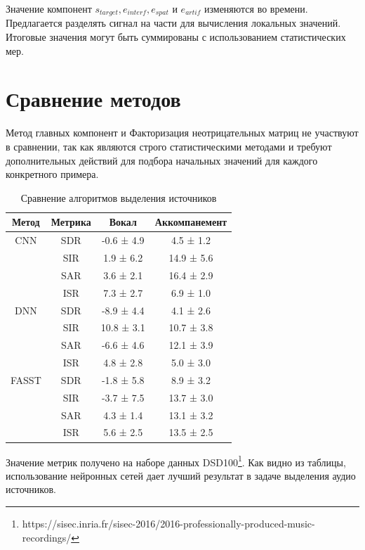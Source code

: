 Значение компонент $s_{target}, e_{interf}, e_{spat}$ и $e_{artif}$ изменяются во времени. Предлагается разделять сигнал на части для вычисления локальных значений. Итоговые значения могут быть суммированы с использованием статистических мер.

\section{Сравнение методов}

Метод главных компонент и Факторизация неотрицательных матриц не участвуют в сравнении, так как являются строго статистическими методами и требуют дополнительных действий для подбора начальных значений для каждого конкретного примера.

\begin{table}[h]
	\caption{\label{tab:canonsummary}Сравнение алгоритмов выделения источников}
	\begin{center}
		\begin{tabular}{|c|c|c|c|}
			\hline
			Метод & Метрика & Вокал & Аккомпанемент \\
			\hline
			CNN & SDR & -0.6 ± 4.9 & 4.5 ± 1.2 \\
				& SIR & 1.9 ± 6.2 & 14.9 ± 5.6 \\
				& SAR & 3.6 ± 2.1 & 16.4 ± 2.9 \\
				& ISR & 7.3 ± 2.7 & 6.9 ± 1.0 \\
			\hline
			DNN & SDR & -8.9 ± 4.4 & 4.1 ± 2.6 \\
			& SIR & 10.8 ± 3.1 & 10.7 ± 3.8 \\
			& SAR & -6.6 ± 4.6 & 12.1 ± 3.9 \\
			& ISR & 4.8 ± 2.8 & 5.0 ± 3.0 \\
			\hline
			FASST & SDR & -1.8 ± 5.8 & 8.9 ± 3.2 \\
			& SIR & -3.7 ± 7.5 & 13.7 ± 3.0 \\
			& SAR & 4.3 ± 1.4 & 13.1 ± 3.2 \\
			& ISR & 5.6 ± 2.5 & 13.5 ± 2.5 \\
			\hline
		\end{tabular}
	\end{center}
\end{table} 

Значение метрик получено на наборе данных DSD100\footnote{https://sisec.inria.fr/sisec-2016/2016-professionally-produced-music-recordings/}. Как видно из таблицы, использование нейронных сетей дает лучший результат в задаче выделения аудио источников.

